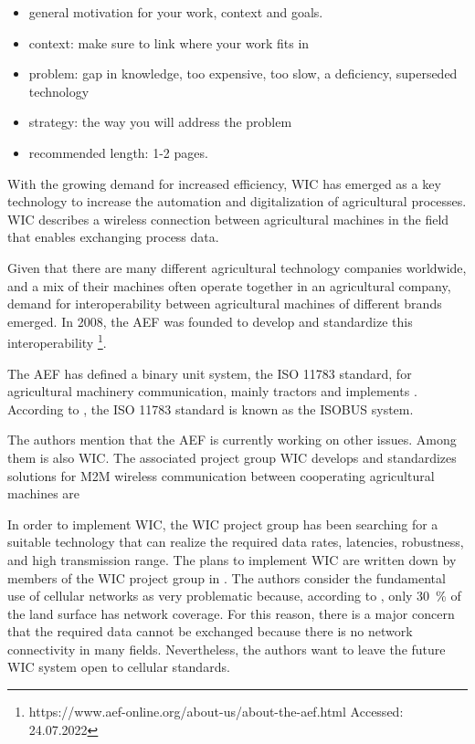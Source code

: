 
\begin{itemize}
\item general motivation for your work, context and goals.
\item context: make sure to link where your work fits in
\item problem: gap in knowledge, too expensive, too slow, a deficiency, superseded technology
\item strategy: the way you will address the problem
\item recommended length: 1-2 pages.
\end{itemize}

With the growing demand for increased efficiency, \ac{WIC} has emerged as a key technology to increase the automation
and digitalization of agricultural processes. \ac{WIC} describes a wireless connection between agricultural machines in the field that enables exchanging process data.

Given that there are many different agricultural technology companies worldwide, and a mix of their machines often operate
together in an agricultural company, demand for interoperability between agricultural machines of different brands emerged.
In 2008, the \ac{AEF} was founded to develop and standardize this interoperability
\footnote{https://www.aef-online.org/about-us/about-the-aef.html Accessed: 24.07.2022}.

The AEF has defined a binary unit system, the ISO 11783 standard, for agricultural machinery communication, mainly tractors and
implements \cite{iglesias_enabling_2014}. According to \textcite{schlingmann_aef_2019}, the ISO 11783 standard is known as
the ISOBUS system.

The authors mention that the AEF is currently working on other issues. Among them is also \ac{WIC}.
The associated project group \ac{WIC} develops and standardizes solutions for \ac{M2M} wireless communication between cooperating agricultural machines are

In order to implement \ac{WIC}, the \ac{WIC} project group has been searching for a suitable technology
that can realize the required data rates, latencies, robustness, and high transmission range.
The plans to implement \ac{WIC} are written down by members of the \ac{WIC} project group in \cite{schlingmann_challenges_2017}.
The authors consider the fundamental use of cellular networks as very problematic
because, according to \cite{itu2016facts}, only \SI{30}{\percent} of the land surface has network coverage.
For this reason, there is a major concern that the required data cannot be exchanged because there is
no network connectivity in many fields. Nevertheless, the authors want to leave the future \ac{WIC} system open
to cellular standards.


